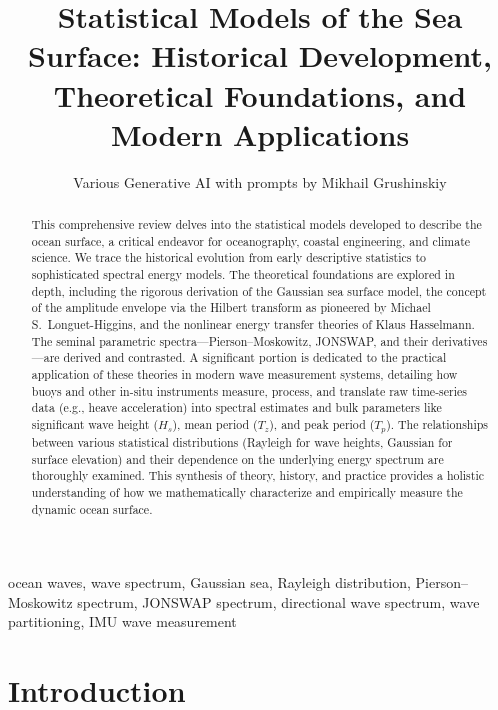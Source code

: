 \documentclass[journal,10pt,twocolumn]{IEEEtran}
\title{Statistical Models of the Sea Surface: Historical Development, Theoretical Foundations, and Modern Applications}
\author{Various Generative AI with prompts by Mikhail Grushinskiy}
\begin{document}
    \maketitle

    \begin{abstract}
        This comprehensive review delves into the statistical models developed to describe the ocean surface, a critical endeavor for oceanography, coastal engineering, and climate science. We trace the historical evolution from early descriptive statistics to sophisticated spectral energy models. The theoretical foundations are explored in depth, including the rigorous derivation of the Gaussian sea surface model, the concept of the amplitude envelope via the Hilbert transform as pioneered by Michael S.~Longuet-Higgins, and the nonlinear energy transfer theories of Klaus Hasselmann. The seminal parametric spectra---Pierson--Moskowitz, JONSWAP, and their derivatives---are derived and contrasted. A significant portion is dedicated to the practical application of these theories in modern wave measurement systems, detailing how buoys and other in-situ instruments measure, process, and translate raw time-series data (e.g., heave acceleration) into spectral estimates and bulk parameters like significant wave height ($H_s$), mean period ($T_z$), and peak period ($T_p$). The relationships between various statistical distributions (Rayleigh for wave heights, Gaussian for surface elevation) and their dependence on the underlying energy spectrum are thoroughly examined. This synthesis of theory, history, and practice provides a holistic understanding of how we mathematically characterize and empirically measure the dynamic ocean surface.
    \end{abstract}


    \begin{IEEEkeywords}
        ocean waves, wave spectrum, Gaussian sea, Rayleigh distribution, Pierson--Moskowitz spectrum, JONSWAP spectrum, directional wave spectrum, wave partitioning, IMU wave measurement
    \end{IEEEkeywords}

    \section{Introduction}
\end{document}
